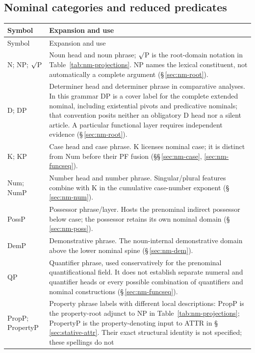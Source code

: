 \subsection{Nominal categories and reduced predicates}
\label{sec:syntax-symbol-nominal}

\begingroup\small
\begin{longtable}{@{}p{}p{}@{}}
\toprule Symbol & Expansion and use \\
\midrule\endfirsthead
\toprule Symbol & Expansion and use \\
\midrule\endhead
\bottomrule\endfoot
N; NP; $\surd$P & Noun head and noun phrase; $\surd$P is the root-domain
notation in Table~\ref{tab:nm-projections}. NP names the lexical constituent,
not automatically a complete argument (§\,\ref{sec:nm-root}). \\
D; DP & Determiner head and determiner phrase in comparative analyses. In
this grammar DP is a cover label for the complete extended nominal, including
existential pivots and predicative nominals; that convention posits neither
an obligatory D head nor a silent article. A particular functional layer
requires independent evidence (§\,\ref{sec:nm-root}). \\
K; KP & Case head and case phrase. K licenses nominal case; it is distinct
from Num before their PF fusion (§§\,\ref{sec:nm-case}, \ref{sec:nm-funcseq}). \\
Num; NumP & Number head and number phrase. Singular/plural features combine
with K in the cumulative case-number exponent (§\,\ref{sec:nm-num}). \\
PossP & Possessor phrase/layer. Hosts the prenominal indirect possessor below
case; the possessor retains its own nominal domain
(§\,\ref{sec:nm-poss}). \\
DemP & Demonstrative phrase. The noun-internal demonstrative domain above
the lower nominal spine (§\,\ref{sec:nm-dem}). \\
QP & Quantifier phrase, used conservatively for the prenominal
quantificational field. It does not establish separate numeral and quantifier
heads or every possible combination of quantifiers and nominal constructions
(§\,\ref{sec:nm-funcseq}). \\
PropP; PropertyP & Property phrase labels with different local descriptions:
PropP is the property-root adjunct to NP in Table~\ref{tab:nm-projections};
PropertyP is the property-denoting input to ATTR in §\,\ref{sec:stative-attr}.
Their exact structural identity is not specified; these spellings do not

\end{longtable}
